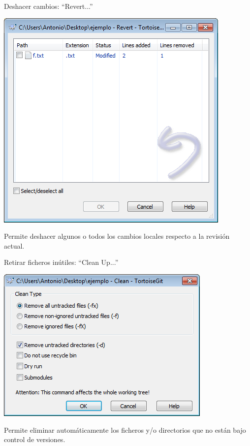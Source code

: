 \documentclass[xcolor=svgnames]{beamer}
\begin{document}
\begin{frame}{Deshacer cambios: ``Revert...''}
  \begin{center}
    \includegraphics[width=\textwidth,height=.7\textheight,keepaspectratio]{tomas/revert.png}
  \end{center}

  Permite deshacer algunos o todos los cambios locales respecto a la
  revisión actual.
\end{frame}

\begin{frame}{Retirar ficheros inútiles: ``Clean Up...''}
  \begin{center}
    \includegraphics[width=\textwidth,height=.7\textheight,keepaspectratio]{tomas/cleanup.png}
  \end{center}

  Permite eliminar automáticamente los ficheros y/o directorios que no
  están bajo control de versiones.
\end{frame}
\end{document}
